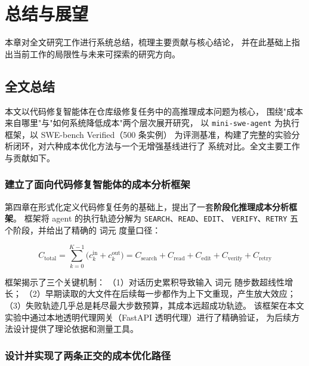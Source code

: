 \chapter{总结与展望}
\label{chap:conclusion}

本章对全文研究工作进行系统总结，梳理主要贡献与核心结论，
并在此基础上指出当前工作的局限性与未来可探索的研究方向。

\section{全文总结}
\label{sec:conclusion-summary}

本文以代码修复智能体在仓库级修复任务中的高推理成本问题为核心，
围绕"成本来自哪里"与"如何系统降低成本"两个层次展开研究，
以 \texttt{mini-swe-agent} 为执行框架，以 SWE-bench Verified（500 条实例）
为评测基准，构建了完整的实验分析闭环，对六种成本优化方法与一个无增强基线进行了
系统对比。全文主要工作与贡献如下。

\subsection{建立了面向代码修复智能体的成本分析框架}
\label{subsec:contribution-framework}

第四章在形式化定义代码修复任务的基础上，提出了一套\textbf{阶段化推理成本分析框架}。
框架将 agent 的执行轨迹分解为 \texttt{SEARCH}、\texttt{READ}、\texttt{EDIT}、
\texttt{VERIFY}、\texttt{RETRY} 五个阶段，并给出了精确的 词元 度量口径：

\begin{equation}
  C_{\text{total}} = \sum_{k=0}^{K-1}\bigl(c_k^{\text{in}} + c_k^{\text{out}}\bigr)
  = C_{\text{search}} + C_{\text{read}} + C_{\text{edit}} + C_{\text{verify}} + C_{\text{retry}}
\end{equation}

框架揭示了三个关键机制：
（1）对话历史累积导致输入 词元 随步数超线性增长；
（2）早期读取的大文件在后续每一步都作为上下文重现，产生放大效应；
（3）失败轨迹几乎总是耗尽最大步数预算，其成本远超成功轨迹。
该框架在本文实验中通过本地透明代理网关（FastAPI 透明代理）进行了精确验证，
为后续方法设计提供了理论依据和测量工具。

\subsection{设计并实现了两条正交的成本优化路径}
\label{subsec:contribution-methods}

